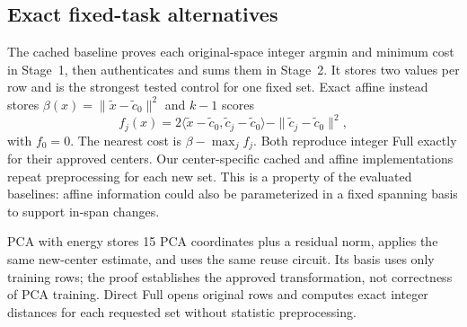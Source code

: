 \subsection{Exact fixed-task alternatives}\label{sec:baselines}
The cached baseline proves each original-space integer argmin and minimum cost in Stage~1, then authenticates and sums them in Stage~2. It stores two values per row and is the strongest tested control for one fixed set. Exact affine instead stores $\beta(x)=\|\widetilde x-\widetilde c_0\|^2$ and $k-1$ scores
\begin{equation}
f_j(x)=2\langle\widetilde x-\widetilde c_0,\widetilde c_j-\widetilde c_0\rangle-
\|\widetilde c_j-\widetilde c_0\|^2,
\end{equation}
with $f_0=0$. The nearest cost is $\beta-\max_j f_j$. Both reproduce integer Full exactly for their approved centers. Our center-specific cached and affine implementations repeat preprocessing for each new set. This is a property of the evaluated baselines: affine information could also be parameterized in a fixed spanning basis to support in-span changes.

PCA with energy stores 15 PCA coordinates plus a residual norm, applies the same new-center estimate, and uses the same reuse circuit. Its basis uses only training rows; the proof establishes the approved transformation, not correctness of PCA training. Direct Full opens original rows and computes exact integer distances for each requested set without statistic preprocessing.
